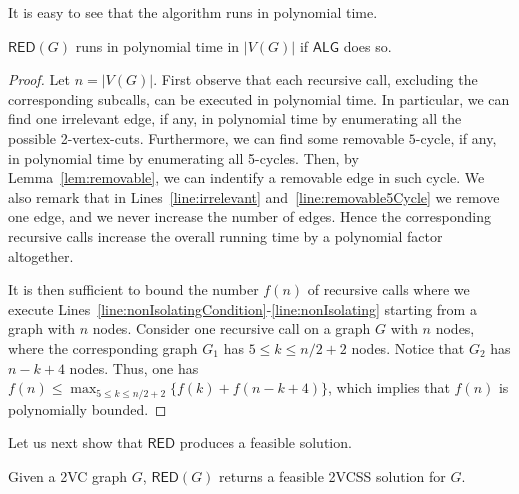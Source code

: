 \documentclass{theoretics}
\newcommand{\ALG}{\mathsf{ALG}}
\newcommand{\RED}{\mathsf{RED}}
\begin{document}
It is easy to see that the algorithm runs in polynomial time. 
\begin{lemma}\label{lem:alg:time}
    $\RED(G)$ runs in polynomial time in $|V(G)|$ if $\ALG$ does so.
\end{lemma}
\begin{proof}
    Let $n=|V(G)|$. First observe that each recursive call, excluding the corresponding subcalls, can be executed in polynomial time. In particular,     
    we can find one irrelevant edge, if any, in polynomial time by enumerating all the possible 2-vertex-cuts. Furthermore, we can find some removable $5$-cycle, if any, in polynomial time by enumerating all 5-cycles. Then, by Lemma~\ref{lem:removable}, we can indentify a removable edge in such cycle. We also remark that in Lines~\ref{line:irrelevant} and~\ref{line:removable5Cycle} we remove one edge, and we never increase the number of edges. Hence the corresponding recursive calls increase the overall running time by a polynomial factor altogether. 

    It is then sufficient to bound the number $f(n)$ of recursive calls where we execute Lines~\ref{line:nonIsolatingCondition}-\ref{line:nonIsolating} starting from a graph with $n$ nodes. Consider one recursive call on a graph $G$ with $n$ nodes, where the corresponding graph $G_1$ has $5\leq k\leq n/2+2$ nodes. Notice that $G_2$ has $n-k+4$ nodes. Thus, one has $f(n)\leq \max_{5\leq k\leq n/2+2}\{f(k)+f(n-k+4)\}$, which implies that $f(n)$ is polynomially bounded.
\end{proof}
Let us next show that $\RED$ produces a feasible solution. 
\begin{lemma}\label{lem:redFeasible}
    Given a 2VC graph $G$, $\RED(G)$ returns a feasible 2VCSS solution for $G$.
\end{lemma}
\end{document}
